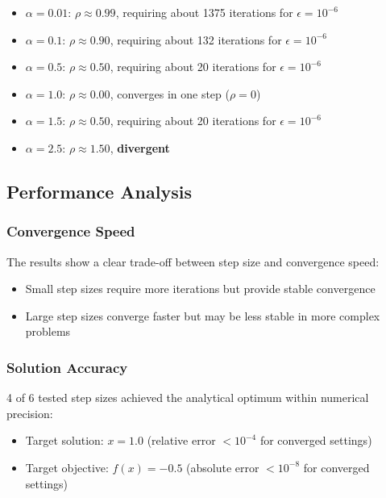 \documentclass[
]{article}
\providecommand{\tightlist}{%
  \setlength{\itemsep}{0pt}\setlength{\parskip}{0pt}}
\begin{document}
\begin{itemize}
\tightlist
\item
  \(\alpha = 0.01\): \(\rho \approx 0.99\), requiring
  about 1375 iterations for \(\epsilon = 10^{-6}\)
\item
  \(\alpha = 0.1\): \(\rho \approx 0.90\), requiring about 132
  iterations for \(\epsilon = 10^{-6}\)
\item
  \(\alpha = 0.5\): \(\rho \approx 0.50\), requiring about 20
  iterations for \(\epsilon = 10^{-6}\)
\item
  \(\alpha = 1.0\): \(\rho \approx 0.00\), converges in one step
  (\(\rho = 0\))
\item
  \(\alpha = 1.5\): \(\rho \approx 0.50\), requiring about 20
  iterations for \(\epsilon = 10^{-6}\)
\item
  \(\alpha = 2.5\): \(\rho \approx 1.50\), \textbf{divergent}
\end{itemize}

\subsection{Performance Analysis}\label{performance-analysis}

\subsubsection{Convergence Speed}\label{convergence-speed}

The results show a clear trade-off between step size and convergence
speed:

\begin{itemize}
\tightlist
\item
  Small step sizes require more iterations but provide stable
  convergence
\item
  Large step sizes converge faster but may be less stable in more
  complex problems
\end{itemize}

\subsubsection{Solution Accuracy}\label{solution-accuracy}

4 of 6 tested step sizes achieved the analytical optimum within
numerical precision:

\begin{itemize}
\tightlist
\item
  Target solution: \(x = 1.0\) (relative error \(< 10^{-4}\) for
  converged settings)
\item
  Target objective: \(f(x) = -0.5\) (absolute error \(< 10^{-8}\) for
  converged settings)
\end{itemize}
\end{document}
